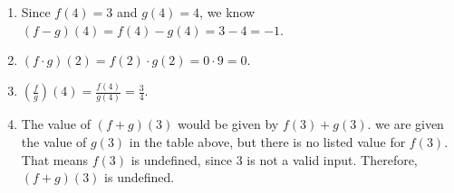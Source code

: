 \documentclass{ximera}
\begin{document}
\begin{example}
\begin{explanation}
\begin{enumerate}
				\item Since $f(4)=3$ and $g(4)=4$, we know $(f-g)(4)=f(4) - g(4) = 3-4 = -1$.

				\item $(f\cdot g)(2) = f(2)\cdot g(2) = 0 \cdot 9 = 0$.

				\item $\left( \frac{f}{g}\right)(4) = \frac{f(4)}{g(4)}=\frac{3}{4}$.
				
				\item The value of $(f+g)(3)$ would be given by $f(3)+g(3)$. we are given the value of $g(3)$ in the table above, but there is no listed
					value for $f(3)$. That means $f(3)$ is undefined, since $3$ is not a valid input. Therefore, $(f+g)(3)$ is undefined.
			\end{enumerate}
		\end{explanation}
	\end{example}	
\end{document}
